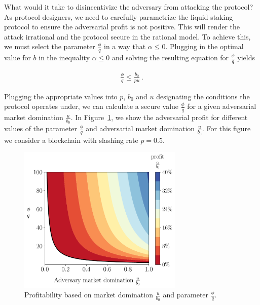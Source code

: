 What would it take to disincentivize the adversary from attacking the protocol?
As protocol designers, we need to carefully parametrize the liquid staking protocol
to ensure the adversarial profit is not positive. This will render the attack irrational
and the protocol secure in the rational model. To achieve this, we must select
the parameter $\frac{\phi}{q}$ in a way that $\alpha \leq 0$.
Plugging in the optimal value for $b$ in the inequality $\alpha \leq 0$ and solving
the resulting equation for $\frac{\phi}{q}$ yields

\begin{gather*}
  \frac{\phi}{q} \leq \frac{b_0}{p u}\,. \label{eq:phi-choice} \tag{$\ast$}
\end{gather*}

%


Plugging the appropriate values
into $p$, $b_0$ and $u$
designating the conditions the protocol
operates under, we can calculate a secure value
$\frac{\phi}{q}$ for a given adversarial market domination $\frac{u}{b_0}$.
In Figure~\ref{fig:contour-plotu}, we show the adversarial profit for
different values of the parameter $\frac{\phi}{q}$ and adversarial market
domination $\frac{u}{b_0}$.
For this figure we consider a blockchain with slashing rate $p = 0.5$.


\begin{figure}[htb]
  \centering
  \includegraphics[width=0.7\textwidth]{./plots/plotu.pdf}
  \caption{Profitability based on market domination
            $\frac{u}{b_0}$ and parameter $\frac{\phi}{q}$.}
  \label{fig:contour-plotu}
\end{figure}


